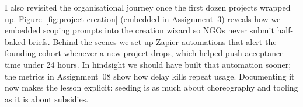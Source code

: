 I also revisited the organisational journey once the first dozen projects wrapped up. Figure~\ref{fig:project-creation} (embedded in Assignment~3) reveals how we embedded scoping prompts into the creation wizard so NGOs never submit half-baked briefs. Behind the scenes we set up Zapier automations that alert the founding cohort whenever a new project drops, which helped push acceptance time under 24 hours. In hindsight we should have built that automation sooner; the metrics in Assignment~08 show how delay kills repeat usage. Documenting it now makes the lesson explicit: seeding is as much about choreography and tooling as it is about subsidies.
